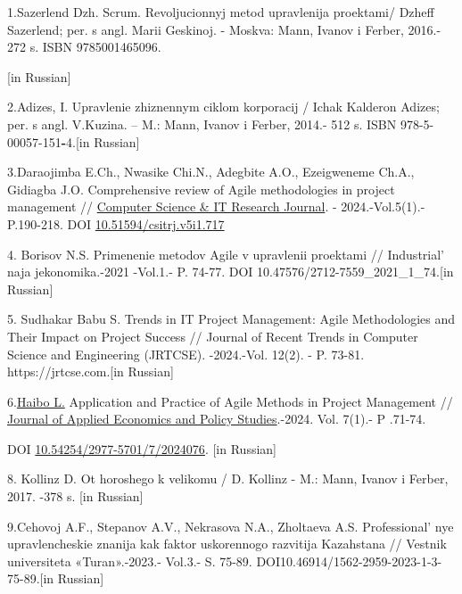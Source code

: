 \begin{references}

1.Sazerlend Dzh. Scrum. Revoljucionnyj metod upravlenija proektami/
Dzheff Sazerlend; per. s angl. Marii Geskinoj. - Moskva: Mann, Ivanov i
Ferber, 2016.- 272 s. ISBN 9785001465096.

{[}in Russian{]}

2.Adizes, I. Upravlenie zhiznennym ciklom korporacij / Ichak Kalderon
Adizes; per. s angl. V.Kuzina. -- M.: Mann, Ivanov i Ferber, 2014.- 512
s. ISBN 978-5-00057-151{\bfseries -}4.{[}in Russian{]}

3.Daraojimba E.Ch., Nwasike Chi.N., Adegbite A.O., Ezeigweneme Ch.A.,
Gidiagba J.O. Comprehensive review of Agile methodologies in project
management //
\href{https://www.researchgate.net/journal/Computer-Science-IT-Research-Journal-2709-0051?_tp=eyJjb250ZXh0Ijp7ImZpcnN0UGFnZSI6Il9kaXJlY3QiLCJwYWdlIjoicHVibGljYXRpb24iLCJwcmV2aW91c1BhZ2UiOiJfZGlyZWN0In19}{Computer
Science \& IT Research Journal}. - 2024.-Vol.5(1).- P.190-218. DOI
\href{http://dx.doi.org/10.51594/csitrj.v5i1.717}{10.51594/csitrj.v5i1.717}

4. Borisov N.S. Primenenie metodov Agile v upravlenii proektami //
Industrial' naja jekonomika.-2021 -Vol.1.- P. 74-77. DOI
10.47576/2712-7559\_2021\_1\_74.{[}in Russian{]}

5. Sudhakar Babu S. Trends in IT Project Management: Agile Methodologies
and Their Impact on Project Success // Journal of Recent Trends in
Computer Science and Engineering (JRTCSE). -2024.-Vol. 12(2). - P.
73-81. https://jrtcse.com.{[}in Russian{]}

6.\href{https://www.researchgate.net/scientific-contributions/Haibo-Li-2290691805?_tp=eyJjb250ZXh0Ijp7ImZpcnN0UGFnZSI6Il9kaXJlY3QiLCJwYWdlIjoicHVibGljYXRpb24iLCJwcmV2aW91c1BhZ2UiOiJfZGlyZWN0In19}{Haibo
L.} Application and Practice of Agile Methods in Project Management //
\href{https://www.researchgate.net/journal/Journal-of-Applied-Economics-and-Policy-Studies-2977-571X?_tp=eyJjb250ZXh0Ijp7ImZpcnN0UGFnZSI6Il9kaXJlY3QiLCJwYWdlIjoicHVibGljYXRpb24iLCJwcmV2aW91c1BhZ2UiOiJfZGlyZWN0In19}{Journal
of Applied Economics and Policy Studies}.-2024. Vol. 7(1).- P .71-74.

DOI
\href{http://dx.doi.org/10.54254/2977-5701/7/2024076}{10.54254/2977-5701/7/2024076}.
{[}in Russian{]}

8. Kollinz D. Ot horoshego k velikomu / D. Kollinz - M.: Mann, Ivanov i
Ferber, 2017. -378 s. {[}in Russian{]}

9.Cehovoj A.F., Stepanov A.V., Nekrasova N.A., Zholtaeva A.S.
Professional' nye upravlencheskie znanija kak faktor
uskorennogo razvitija Kazahstana // Vestnik universiteta «Turan».-2023.-
Vol.3.- S. 75-89. DOI10.46914/1562-2959-2023-1-3-75-89.{[}in Russian{]}


\end{references}
